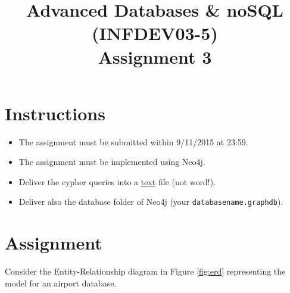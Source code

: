 \documentclass[10pt,a4paper]{article}
\title{Advanced Databases \& noSQL (INFDEV03-5) \\ Assignment 3}
\author { }
\date { }
\begin{document}
\maketitle

\section*{Instructions}
\begin{itemize}[noitemsep]
\item The assignment must be submitted within 9/11/2015 at 23:59.
\item The assignment must be implemented using Neo4j.
\item Deliver the cypher queries into a \underline{text} file (not word!).
\item Deliver also the database folder of Neo4j (your \texttt{database\textunderscore name.graphdb}).
\end{itemize}

\section*{Assignment}
Consider the Entity-Relationship diagram in Figure \ref{fig:erd} representing the model for an airport database.
\end{document}
